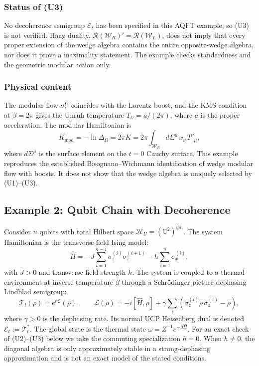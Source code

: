 \documentclass[12pt,a4paper,openany]{book}
\begin{document}
\subsubsection{Status of (U3)}

No decoherence semigroup $\mathcal E_t$ has been specified in this AQFT example, so (U3) is not verified.  Haag duality, $\mathcal R(\mathcal W_R)'=\mathcal R(\mathcal W_L)$, does not imply that every proper extension of the wedge algebra contains the entire opposite-wedge algebra, nor does it prove a maximality statement.  The example checks standardness and the geometric modular action only.

\subsubsection{Physical content}

The modular flow $\sigma_t^\Omega$ coincides with the Lorentz boost, and the KMS condition at $\beta = 2\pi$ gives the Unruh temperature $T_U = a/(2\pi)$, where $a$ is the proper acceleration.
The modular Hamiltonian is
\begin{equation}
K_{\mathrm{mod}} = -\ln \Delta_\Omega = 2\pi K = 2\pi \int_{\mathcal{W}_R} d\Sigma^\mu\, x_\nu\, T^{\nu}{}_\mu,
\end{equation}
where $d\Sigma^\mu$ is the surface element on the $t = 0$ Cauchy surface.
This example reproduces the established Bisognano--Wichmann identification of wedge modular flow with boosts.  It does not show that the wedge algebra is uniquely selected by (U1)--(U3).


\subsection{Example 2: Qubit Chain with Decoherence}
\label{D-sec:qubit}

Consider $n$ qubits with total Hilbert space $\mathcal{H}_U = (\mathbb{C}^2)^{\otimes n}$.
The system Hamiltonian is the transverse-field Ising model:
\begin{equation}
\hat{H} = -J \sum_{i=1}^{n-1} \sigma_z^{(i)} \sigma_z^{(i+1)} - h \sum_{i=1}^{n} \sigma_x^{(i)},
\end{equation}
with $J > 0$ and transverse field strength $h$.
The system is coupled to a thermal environment at inverse temperature $\beta$ through a Schr\"odinger-picture dephasing Lindblad semigroup:
\begin{equation}
\label{D-eq:lindblad}
\mathcal{T}_t(\rho) = e^{t\mathcal{L}}(\rho), \qquad \mathcal{L}(\rho) = -i[\hat{H}, \rho] + \gamma \sum_i \left(\sigma_z^{(i)} \rho\, \sigma_z^{(i)} - \rho\right),
\end{equation}
where $\gamma > 0$ is the dephasing rate.  Its normal UCP Heisenberg dual is denoted $\mathcal E_t:=\mathcal T_t^*$.
The global state is the thermal state $\omega = Z^{-1} e^{-\beta \hat{H}}$.  For an exact check of (U2)--(U3) below we take the commuting specialization $h=0$.  When $h\ne0$, the diagonal algebra is only approximately stable in a strong-dephasing approximation and is not an exact model of the stated conditions.
\end{document}
